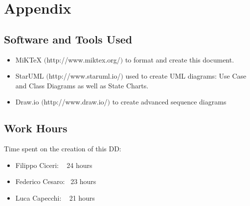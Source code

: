\section{Appendix}

	\subsection{Software and Tools Used}
		\begin{itemize}
			\item MiKTeX $($http://www.miktex.org/$)$ to format and create this document.
			\item StarUML $($http://www.staruml.io/$)$ used to create UML diagrams: Use Case and Class Diagrams as well as State Charts.
			\item Draw.io $($http://www.draw.io/$)$ to create advanced sequence diagrams
		\end{itemize}

		\subsection{Work Hours}
			Time spent on the creation of this DD:
			\begin{itemize}
				\item Filippo Ciceri: ~ 24 hours
				\item Federico Cesaro: ~23 hours
				\item Luca Capecchi: ~ 21 hours
			\end{itemize}